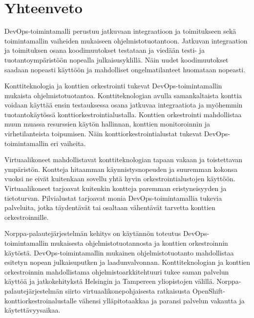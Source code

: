 \chapter{Yhteenveto\label{summary}}

DevOps-toimintamalli perustuu jatkuvaan integraatioon ja toimitukseen sekä toimintamallin vaiheiden mukaiseen ohjelmistotuotantoon.
Jatkuvan integraation ja toimituksen osana koodimuutokset testataan ja viedään testi- ja tuotantoympäristöön nopealla julkaisusyklillä.
Näin uudet koodimuutokset saadaan nopeasti käyttöön ja mahdolliset ongelmatilanteet huomataan nopeasti.

Konttiteknologia ja konttien orkestrointi tukevat DevOps-toimintamallin mukaista ohjelmistotuotantoa.
Konttiteknologian avulla samankaltaista konttia voidaan käyttää ensin testauksessa osana jatkuvaa integraatiota ja myöhemmin tuotantokäytössä konttiorkestrointialustalla.
Konttien orkestrointi mahdollistaa muun muassa resurssien käytön hallinnan, konttien monitoroinnin ja virhetilanteista toipumisen.
Näin konttiorkestrointialustat tukevat DevOps-toimintamallin eri vaiheita.

Virtuaalikoneet mahdollistavat konttiteknologian tapaan vakaan ja toistettavan ympäristön.
Kontteja hitaamman käynnistysnopeuden ja suuremman kokonsa vuoksi ne eivät kuitenkaan sovellu yhtä hyvin orkestrointialustojen käyttöön.
Virtuaalikoneet tarjoavat kuitenkin kontteja paremman eristyneisyyden ja tietoturvan.
Pilvialustat tarjoavat monia DevOps-toimintamallia tukevia palveluita, jotka täydentävät tai osaltaan vähentävät tarvetta konttien orkestroinnille.

Norppa-palautejärjestelmän kehitys on käytännön toteutus DevOps-toimintamallin mukaisesta ohjelmistotuotannosta ja konttien orkestroinnin käytöstä.
DevOps-toimintamallin mukainen ohjelmistotuotanto mahdollistaa esitetyn nopean julkaisuputken ja laadunvalvonnan.
Konttiteknologian ja konttien orkestroinnin mahdollistama ohjelmistoarkkitehtuuri tukee saman palvelun käyttöä ja jatkokehitykstä Helsingin ja Tampereen yliopistojen välillä.
Norppa-palautejärjestelmän siirto virtuaalikonepohjaisesta ratkaisusta OpenShift-konttiorkestroinalustalle vähensi ylläpitotaakkaa ja paransi palvelun vakautta ja käytettävyysaikaa.
